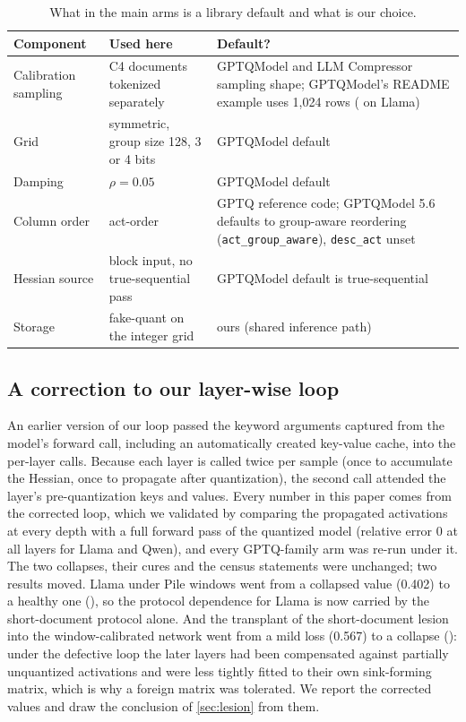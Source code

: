 \begin{table}[htbp]
\caption{What in the main arms is a library default and what is our choice.}
\label{tab:defaults}
\begin{center}
\footnotesize
\setlength{\tabcolsep}{4pt}\begin{tabular}{l>{\raggedright\arraybackslash}p{4.2cm}>{\raggedright\arraybackslash}p{6.0cm}}
\toprule
Component & Used here & Default? \\
\midrule
Calibration sampling & 128 C4 documents tokenized separately & GPTQModel and LLM Compressor sampling shape; GPTQModel's README example uses 1,024 rows (\LgptqLibIF{} on Llama) \\
Grid & symmetric, group size 128, 3 or 4 bits & GPTQModel default \\
Damping & $\rho=0.05$ & GPTQModel default \\
Column order & act-order & GPTQ reference code; GPTQModel 5.6 defaults to group-aware reordering (\texttt{act\_group\_aware}), \texttt{desc\_act} unset \\
Hessian source & block input, no true-sequential pass & GPTQModel default is true-sequential \\
Storage & fake-quant on the integer grid & ours (shared inference path) \\
\bottomrule
\end{tabular}
\end{center}
\end{table}

\subsection{A correction to our layer-wise loop}
An earlier version of our loop passed the keyword arguments captured from the model's forward call, including an automatically created key-value cache, into the per-layer calls.
Because each layer is called twice per sample (once to accumulate the Hessian, once to propagate after quantization), the second call attended the layer's pre-quantization keys and values.
Every number in this paper comes from the corrected loop, which we validated by comparing the propagated activations at every depth with a full forward pass of the quantized model (relative error $0$ at all layers for Llama and Qwen), and every GPTQ-family arm was re-run under it.
The two collapses, their cures and the census statements were unchanged; two results moved.
Llama under Pile windows went from a collapsed value (0.402) to a healthy one (\LpileIF{}), so the protocol dependence for Llama is now carried by the short-document protocol alone.
And the transplant of the short-document lesion into the window-calibrated network went from a mild loss (0.567) to a collapse (\TPcwin{}): under the defective loop the later layers had been compensated against partially unquantized activations and were less tightly fitted to their own sink-forming matrix, which is why a foreign matrix was tolerated.
We report the corrected values and draw the conclusion of \cref{sec:lesion} from them.

